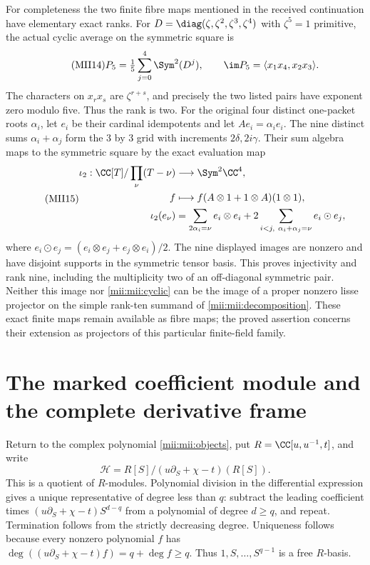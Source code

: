 \documentclass[11pt,a4paper]{article}
\begin{document}
For completeness the two finite fibre maps mentioned in the received
continuation have elementary exact ranks. For
$D=\diag(\zeta,\zeta^2,\zeta^3,\zeta^4)$ with $\zeta^5=1$ primitive,
the actual cyclic average on the symmetric square is
\begin{equation}\tag{MII14}\label{mii:mii:cyclic}
 P_5=\tfrac15\sum_{j=0}^4\Sym^2(D^j),\qquad
 \im P_5=\langle x_1x_4,x_2x_3\rangle.
\end{equation}
The characters on $x_rx_s$ are $\zeta^{r+s}$, and precisely the
two listed pairs have exponent zero modulo five. Thus the rank is
two. For the original four distinct one-packet roots $\alpha_i$,
let $e_i$ be their cardinal idempotents and let $A e_i=\alpha_i e_i$.
The nine distinct sums $\alpha_i+\alpha_j$ form the $3$ by $3$
grid with increments $2\delta,2i\gamma$. Their sum algebra maps to
the symmetric square by the exact evaluation map
\begin{equation}\tag{MII15}\label{mii:mii:sumembedding}
 \begin{aligned}
 \iota_2:\CC[T]/\prod_{\nu}(T-\nu)&\longrightarrow\Sym^2\CC^4,\\
 f&\longmapsto f(A\otimes1+1\otimes A)(1\otimes1),\\
 \iota_2(e_\nu)&=
 \sum_{2\alpha_i=\nu}e_i\otimes e_i
 +2\sum_{i<j,\ \alpha_i+\alpha_j=\nu}e_i\odot e_j,
 \end{aligned}
\end{equation}
where $e_i\odot e_j=(e_i\otimes e_j+e_j\otimes e_i)/2$.
The nine displayed images are nonzero and have disjoint supports in
the symmetric tensor basis. This proves injectivity and rank nine,
including the multiplicity two of an off-diagonal symmetric pair.
Neither this image nor \eqref{mii:mii:cyclic} can be the image of a
proper nonzero lisse projector on the simple rank-ten summand of
\eqref{mii:mii:decomposition}. These exact finite maps remain available
as fibre maps; the proved assertion concerns their extension as
projectors of this particular finite-field family.

\section{The marked coefficient module and the complete derivative frame}
Return to the complex polynomial \eqref{mii:mii:objects}, put
$R=\CC[u,u^{-1},t]$, and write
\[
 \mathscr H=R[S]/(u\partial_S+\chi-t)(R[S]).
\]
This is a quotient of $R$-modules. Polynomial division in the
differential expression gives a unique representative of degree less
than $q$: subtract the leading coefficient times
$(u\partial_S+\chi-t)S^{d-q}$ from a polynomial of degree $d\ge q$,
and repeat. Termination follows from the strictly decreasing degree.
Uniqueness follows because every nonzero polynomial $f$ has
$\deg((u\partial_S+\chi-t)f)=q+\deg f\ge q$.
Thus $1,S,\ldots,S^{q-1}$ is a free $R$-basis.
\end{document}
